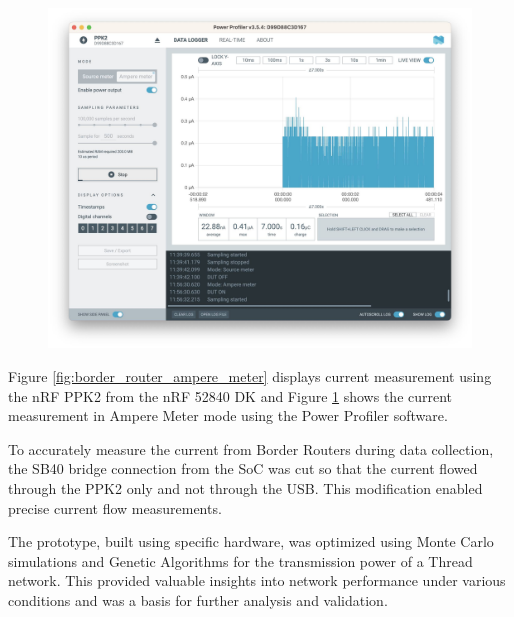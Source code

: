 \begin{figure}[h]
\begin{minipage}[t]{0.45\textwidth}
        \includegraphics[width=1\linewidth]{images/research_design/PPK2_SDK_Ampere.jpg}
        \label{fig:ppk2_ampere_meter}
    \end{minipage}
\end{figure}

Figure \ref{fig:border_router_ampere_meter} displays current measurement using the nRF PPK2 from the nRF 52840 DK and Figure \ref{fig:ppk2_ampere_meter} shows the current measurement in Ampere Meter mode using the Power Profiler software.

\vspace{2mm}
To accurately measure the current from Border Routers during data collection, the SB40 bridge connection from the SoC was cut so that the current flowed through the PPK2 only and not through the USB. This modification enabled precise current flow measurements.

The prototype, built using specific hardware, was optimized using Monte Carlo simulations and Genetic Algorithms for the transmission power of a Thread network. This provided valuable insights into network performance under various conditions and was a basis for further analysis and validation.
